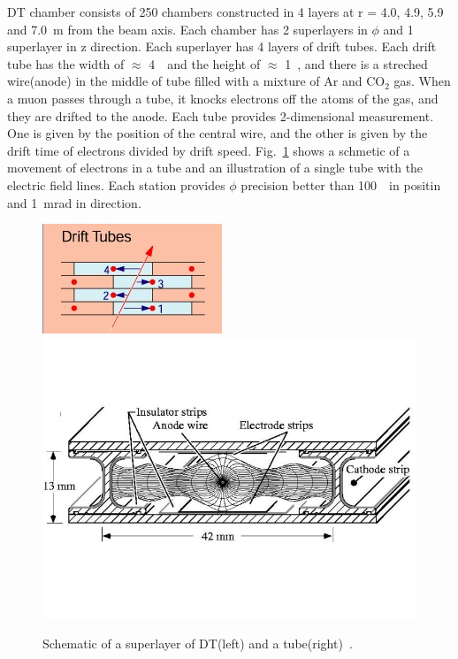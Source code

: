 DT chamber consists of 250 chambers constructed in 4 layers at r = 4.0, 4.9, 5.9 
and 7.0~m from the beam axis. Each chamber has 2 superlayers in $\phi$ and 
1 superlayer in z direction. Each superlayer has 4 layers of drift tubes. 
Each drift tube has the width of $\approx$ 4~\cm\ and the height of $\approx$ 1~\cm, 
and there is a streched wire(anode) in the middle of tube filled with a mixture of 
Ar and $\textrm{CO}_2$ gas. When a muon passes through a tube, it knocks 
electrons off the atoms of the gas, and they are drifted to the anode.
Each tube provides 2-dimensional measurement. One is given by the position of 
the central wire, and the other is given by the drift time of electrons divided by
drift speed. Fig.~\ref{fig:muon_dt} shows a schmetic of a 
movement of electrons in a tube and an illustration of a single tube with the
electric field lines. Each station provides $\phi$ precision better than 100~\um\ 
in positin and 1~mrad in direction. 
%
\begin{figure}[h] 
\centering
\vspace{1cm}
\includegraphics[height=0.3\textwidth]{figures/DT.jpg} 
\includegraphics[height=0.3\textwidth]{figures/DT_onetube.jpg}
\caption{Schematic of a superlayer of DT(left) and a tube(right)~\cite{Maselli:1196170}.}
\label{fig:muon_dt} 
\end{figure} 


